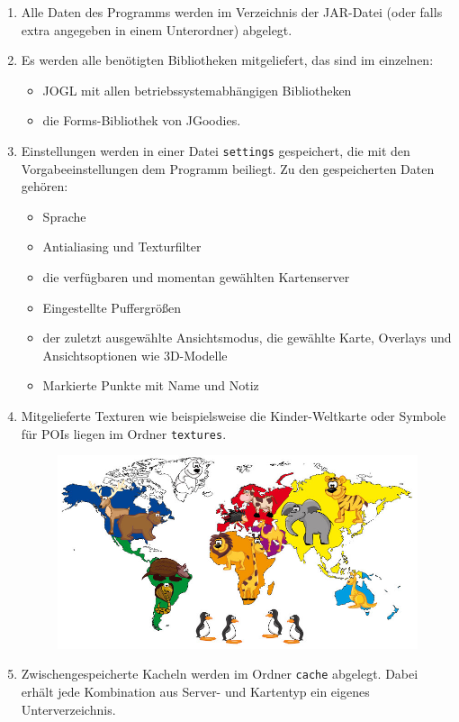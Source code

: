 \documentclass[10pt]{scrreprt}
\newcommand{\ziel}[1]{{\fontsize{9.5}{11}\textsf{/#1/}}}
\newcommand{\ziellabel}{Z}
\newcommand{\muss}{\renewcommand{\labelenumi}{\textbf{\ziel{\ziellabel\numprint{\theenumi}0}}}}
\newcommand{\wunsch}{\renewcommand{\labelenumi}{\textbf{\ziel{\ziellabel\numprint{\theenumi}0W}}}}
\begin{document}
\vspace{5mm}

\begin{enumerate}[leftmargin=2cm]
\item Alle Daten des Programms werden im Verzeichnis der JAR-Datei (oder falls extra angegeben in einem Unterordner) abgelegt.
\item Es werden alle benötigten Bibliotheken mitgeliefert, das sind im einzelnen: 
\begin{itemize}
\item JOGL mit allen betriebssystemabhängigen Bibliotheken
\item die Forms-Bibliothek von JGoodies.
\end{itemize}
\wunsch
\item Einstellungen werden in einer Datei \texttt{settings} gespeichert, die mit den Vorgabeeinstellungen dem Programm beiliegt. Zu den gespeicherten Daten gehören:
\begin{itemize}
\item Sprache
\item Antialiasing und Texturfilter
\item die verfügbaren und momentan gewählten Kartenserver
\item Eingestellte Puffergrößen
\item der zuletzt ausgewählte Ansichtsmodus, die gewählte Karte, Overlays und Ansichtsoptionen wie 3D-Modelle
\item Markierte Punkte mit Name und Notiz
\end{itemize}
\muss
\item Mitgelieferte Texturen wie beispielsweise die Kinder-Weltkarte oder Symbole für POIs liegen im Ordner \texttt{textures}.
\begin{figure}[!htb]
	\centering
	\includegraphics[scale=0.3]{Kinder-Weltkarte.jpg}
\end{figure}
\item Zwischengespeicherte Kacheln werden im Ordner \texttt{cache} abgelegt. Dabei erhält jede Kombination aus Server- und Kartentyp ein eigenes Unterverzeichnis.
\end{enumerate}
\end{document}
